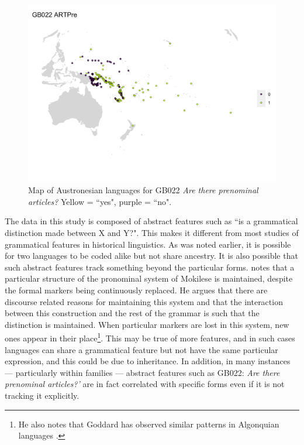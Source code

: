 \documentclass[a4paper,10pt]{article} %
\begin{document}
\begin{figure}
\centering
\includegraphics[width=20cm]{illustrations/plots_from_R/coverage_plots/maps/map_GB022.png}
\caption{{Map of Austronesian languages for GB022 \emph{Are there prenominal articles?} Yellow = ``yes", purple = ``no".}}
\label{fig:gb022_map}
\end{figure}

The data in this study is composed of abstract features such as ``is a grammatical distinction made between X and Y?". This makes it different from most studies of grammatical features in historical linguistics. As was noted earlier, it is possible for two languages to be coded alike but not share ancestry. It is also possible that such abstract features track something beyond the particular forms. \citet[503]{ross2004morphosyntactic} notes that a particular structure of the pronominal system of Mokilese is maintained, despite the formal markers being continuously replaced. He argues that there are discourse related reasons for maintaining this system and that the interaction between this construction and the rest of the grammar is such that the distinction is maintained. When particular markers are lost in this system, new ones appear in their place\footnote{He also notes that Goddard has observed similar patterns in Algonquian languages \citep{goddard1993algonquian}.}. This may be true of more features, and in such cases languages can share a grammatical feature but not have the same particular expression, and this could be due to inheritance. In addition, in many instances --- particularly within families --- abstract features such as GB022: \emph{Are there prenominal articles?'} are in fact correlated with specific forms even if it is not tracking it explicitly.
\end{document}
